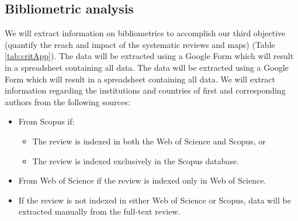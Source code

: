 \documentclass{article}
\newcommand{\bei}{\begin{itemize}}
\newcommand{\eei}{\end{itemize}}
\begin{document}
\subsection{Bibliometric analysis}


We will extract information on bibliometrics to accomplish our third objective (quantify the reach and impact of the systematic reviews and maps) (Table \ref{tab:critApp}). The data will be extracted using a Google Form which will result in a spreadsheet containing all data. The data will be extracted using a Google Form which will result in a spreadsheet containing all data. We will extract information regarding the institutions and countries of first and corresponding authors from the following sources:
\bei
\item From Scopus if:
\bei 
\item The review is indexed in both the Web of Science and Scopus, or
\item The review is indexed exclusively in the Scopus database.
\eei
\item From Web of Science if the review is indexed only in Web of Science.
\item If the review is not indexed in either Web of Science or Scopus, data will be extracted manually from the full-text review.
\eei
\end{document}
